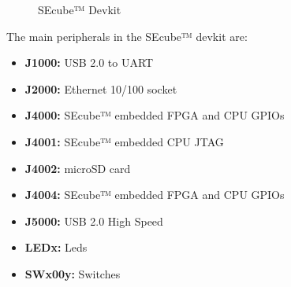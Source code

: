 \begin{figure}[ht]
  \centering
  \caption{SEcube™ Devkit}
 \label{fig:devboard}
\end{figure}

The main peripherals in the SEcube™ devkit are:

\begin{itemize}
\setlength\itemsep{-3pt}
\item \textbf{J1000: }\tabto{2.3cm} USB 2.0 to UART 
\item \textbf{J2000: }\tabto{2.3cm} Ethernet 10/100 socket 
\item \textbf{J4000: }\tabto{2.3cm} SEcube™ embedded FPGA and CPU GPIOs
\item \textbf{J4001: }\tabto{2.3cm} SEcube™ embedded CPU JTAG
\item \textbf{J4002: }\tabto{2.3cm} microSD card 
\item \textbf{J4004: }\tabto{2.3cm} SEcube™ embedded FPGA and CPU GPIOs
\item \textbf{J5000: }\tabto{2.3cm} USB 2.0 High Speed 
\item \textbf{LEDx:  }\tabto{2.3cm} Leds 
\item \textbf{SWx00y:}\tabto{2.3cm} Switches 
\end{itemize}

